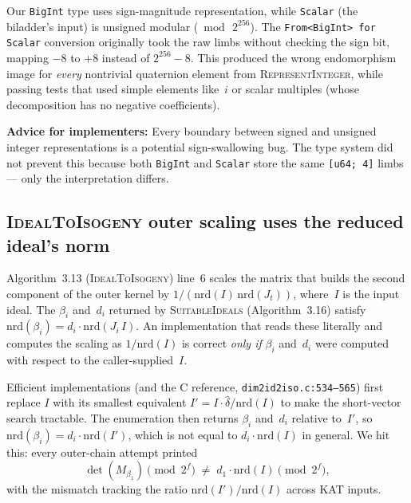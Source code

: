 Our \texttt{BigInt} type uses sign-magnitude representation, while
\texttt{Scalar} (the biladder's input) is unsigned modular
($\bmod\, 2^{256}$).  The \texttt{From<BigInt> for Scalar}
conversion originally took the raw limbs without checking the sign
bit, mapping $-8$ to $+8$ instead of $2^{256} - 8$.  This produced
the wrong endomorphism image for \emph{every} nontrivial quaternion
element from \textsc{RepresentInteger}, while passing tests that
used simple elements like~$i$ or scalar multiples (whose
decomposition has no negative coefficients).

\noindent
\textbf{Advice for implementers:} Every boundary between signed and unsigned
integer representations is a potential sign-swallowing bug.
The type system did not prevent this because both \texttt{BigInt}
and \texttt{Scalar} store the same \texttt{[u64; 4]} limbs --- only
the interpretation differs.

\subsection{\textsc{IdealToIsogeny} outer scaling uses the reduced
  ideal's norm}
\label{sec:bug-parent-ideal-norm}

Algorithm~3.13 (\textsc{IdealToIsogeny}) line~6 scales the matrix that
builds the second component of the outer kernel by
$1/(\mathrm{nrd}(I)\,\mathrm{nrd}(J_t))$, where~$I$ is the input
ideal.  The $\beta_i$ and~$d_i$ returned by
\textsc{SuitableIdeals} (Algorithm~3.16) satisfy
$\mathrm{nrd}(\beta_i) = d_i \cdot \mathrm{nrd}(J_i\,I)$.  An
implementation that reads these literally and computes the
scaling as $1/\mathrm{nrd}(I)$ is correct \emph{only if} $\beta_i$
and~$d_i$ were computed with respect to the caller-supplied~$I$.

Efficient implementations (and the C reference,
\texttt{dim2id2iso.c:534--565}) first replace $I$ with its
smallest equivalent $I' = I \cdot \widehat{\delta}/\mathrm{nrd}(I)$
to make the short-vector search tractable.  The enumeration then
returns $\beta_i$ and~$d_i$ relative to~$I'$, so
$\mathrm{nrd}(\beta_i) = d_i \cdot \mathrm{nrd}(I')$, which is
not equal to $d_i \cdot \mathrm{nrd}(I)$ in general.  We hit
this: every outer-chain attempt printed
\[
  \det(M_{\beta_1}) \pmod{2^f}
  \;\neq\;
  d_1 \cdot \mathrm{nrd}(I) \pmod{2^f},
\]
with the mismatch tracking the ratio
$\mathrm{nrd}(I')/\mathrm{nrd}(I)$ across KAT inputs.

